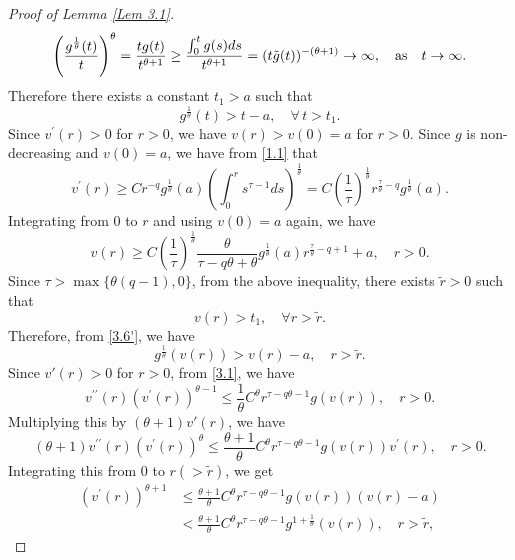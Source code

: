 \documentclass[a4paper,11pt]{amsart}
\theoremstyle{plain}
\theoremstyle{remark}
\numberwithin{equation}{section}
\numberwithin{figure}{section}
\numberwithin{remark}{section}
\begin{document}
\begin{sloppypar}
\begin{proof}[Proof of Lemma \ref{Lem 3.1}]
\begin{equation*}
	\left(\frac{ g^{\frac{1}{\theta}}(t)}{t} \right)^\theta =\frac{t g(t)}{t^{\theta+1}}
	\geq\frac{\int_{0}^{t}g(s)ds}{t^{\theta+1}}=(t\tilde g(t))^{-(\theta+1)}\to \infty, \quad {\rm as} \quad t\to \infty.
\end{equation*}
Therefore there exists a constant $t_1 > a$ such that 	
\begin{equation}\label{3.6'}
	g^{\frac{1}{\theta}}(t)>t-a,\quad \forall \,t>t_1.
\end{equation}
Since $v^{\prime}(r)>0$ for $r>0$, we have $v(r)>v(0)=a$ for $r>0$.
Since $g$ is non-decreasing and $v(0)=a$, we have from \eqref{1.1} that 
$$v^\prime(r) \ge Cr^{-q}g^{\frac{1}{\theta}}(a)\left (\int_0^r s^{\tau-1} ds \right)^{\frac{1}{\theta}} = C\left (\frac{1}{\tau}\right)^{\frac{1}{\theta}}r^{\frac{\tau}{\theta}-q} g^{\frac{1}{\theta}}(a).$$
Integrating from $0$ to $r$ and using $v(0)=a$ again, we have
$$v(r)\geq C\left (\frac{1}{\tau}\right)^{\frac{1}{\theta}} \frac{\theta}{\tau - q \theta + \theta}g^{\frac{1}{\theta}}(a) r^{\frac{\tau}{\theta}-q+1}  +a, \quad   r>0.$$
Since $\tau > \max \{\theta (q-1), 0\}$, from the above inequality, there exists $\tilde r>0$ such that
$$v(r)>t_1, \quad {\forall} r>\tilde r.$$
Therefore,  from \eqref{3.6'}, we have
\begin{equation}\label{3.10}
	g^{\frac{1}{\theta}}(v(r))>v(r)-a, \quad   r>\tilde r.
\end{equation}
Since $v'(r)>0$ for $r>0$, from \eqref{3.1}, we have
\begin{equation*}
v^{\prime\prime}(r)\left( v^{\prime}(r)\right)^{\theta - 1}
\le \frac{1}{\theta} C^\theta r^{\tau - q\theta -1} g(v(r)), \quad r>0.
\end{equation*}
Multiplying this by $(\theta+1)v'(r)$, we have
\begin{equation*}
(\theta+1)v^{\prime\prime}(r)\left( v^{\prime}(r)\right)^{\theta}
\le \frac{\theta + 1}{\theta} C^\theta r^{\tau - q\theta -1} g(v(r)) v^{\prime}(r), \quad r>0.
\end{equation*}
Integrating this from $0$ to $r(>\tilde r)$, we get
\begin{equation}\label{3.11}
\begin{aligned}
		\left(v^{\prime}(r)\right)^{\theta + 1} & \le \frac{\theta + 1}{\theta} C^\theta r^{\tau - q\theta -1} g(v(r))(v(r)-a) \\
		& < \frac{\theta + 1}{\theta} C^\theta r^{\tau - q\theta -1} g^{1+\frac{1}{\theta}}(v(r)), \quad r> \tilde r,
\end{aligned}
\end{equation}

\end{proof}
\end{sloppypar}
\end{document}
